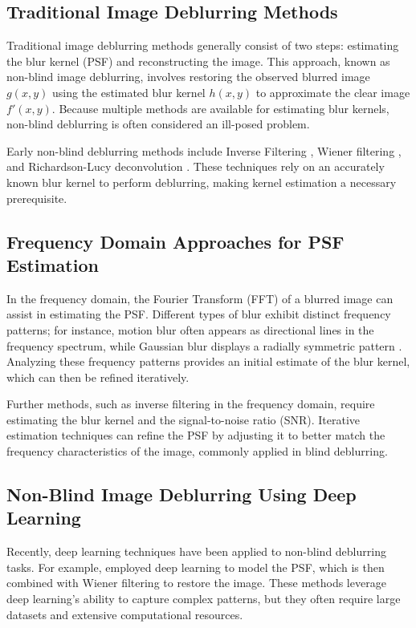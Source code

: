 \documentclass[twoside,11pt]{article}
\begin{document}
\subsection{Traditional Image Deblurring Methods}
Traditional image deblurring methods generally consist of two steps: estimating the blur kernel (PSF) and reconstructing the image. This approach, known as non-blind image deblurring, involves restoring the observed blurred image \( g(x, y) \) using the estimated blur kernel \( h(x, y) \) to approximate the clear image \( f'(x, y) \). Because multiple methods are available for estimating blur kernels, non-blind deblurring is often considered an ill-posed problem.

Early non-blind deblurring methods include Inverse Filtering \citep{saberi1999inverse}, Wiener filtering \citep{wiener1949extrapolation}, and Richardson-Lucy deconvolution \citep{richardson1972bayesian}. These techniques rely on an accurately known blur kernel to perform deblurring, making kernel estimation a necessary prerequisite.

\subsection{Frequency Domain Approaches for PSF Estimation}
In the frequency domain, the Fourier Transform (FFT) of a blurred image can assist in estimating the PSF. Different types of blur exhibit distinct frequency patterns; for instance, motion blur often appears as directional lines in the frequency spectrum, while Gaussian blur displays a radially symmetric pattern \citep{john2020fourier}. Analyzing these frequency patterns provides an initial estimate of the blur kernel, which can then be refined iteratively.

Further methods, such as inverse filtering in the frequency domain, require estimating the blur kernel and the signal-to-noise ratio (SNR). Iterative estimation techniques can refine the PSF by adjusting it to better match the frequency characteristics of the image, commonly applied in blind deblurring.

\subsection{Non-Blind Image Deblurring Using Deep Learning}
Recently, deep learning techniques have been applied to non-blind deblurring tasks. For example, \citet{dong2024dwdn} employed deep learning to model the PSF, which is then combined with Wiener filtering to restore the image. These methods leverage deep learning’s ability to capture complex patterns, but they often require large datasets and extensive computational resources.
\end{document}

